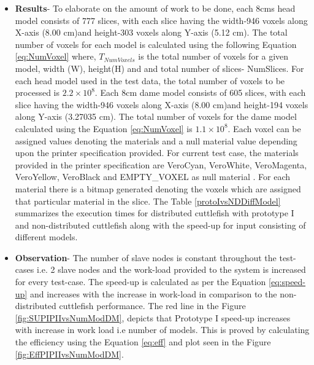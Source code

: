 \begin{enumerate}
\begin{itemize}
\item{\textbf{Results}}- To elaborate on the amount of work to be done, each 8cms head model consists of 777 slices, with each slice having the width-946 voxels along X-axis (8.00 cm)and height-303 voxels along Y-axis (5.12 cm). The total number of voxels for each model is calculated using the following Equation \ref{eq:NumVoxel} where, \begin{math} T_{NumVoxels} \end{math} is the total number of voxels for a given model, width (W), height(H) and and total number of slices- NumSlices. For each head model used in the test data, the total number of voxels to be processed is \begin{math} 2.2 \times 10^{8} \end{math}. Each 8cm dame model consists of 605 slices, with each slice having the width-946 voxels along X-axis (8.00 cm)and height-194 voxels along Y-axis (3.27035 cm). The total number of voxels for the dame model calculated using the Equation \ref{eq:NumVoxel} is  \begin{math} 1.1 \times 10^{8} \end{math}. Each voxel can be assigned values denoting the materials and a null material value depending upon the printer specification provided. For current test case, the materials provided in the printer specification are VeroCyan, VeroWhite, VeroMagenta, VeroYellow, VeroBlack and EMPTY\_VOXEL as null material . For each material there is a bitmap generated denoting the voxels which are assigned that particular material in the slice. The Table \ref{protoIvsNDDiffModel} summarizes the execution times for distributed cuttlefish with prototype I and non-distributed cuttlefish along with the speed-up for input consisting of different models.  
\item{\textbf{Observation}}-  The number of slave nodes is constant throughout the test-cases i.e. 2 slave nodes and the work-load provided to the system is increased for every test-case. The speed-up is calculated as per the Equation \ref{eq:speed-up} and increases with the increase in work-load in comparison to the non-distributed cuttlefish performance. The red line in the Figure \ref{fig:SUPIPIIvsNumModDM},  depicts that Prototype I speed-up increases with increase in work load i.e number of models. This is proved by calculating the efficiency using the Equation \ref{eq:eff} and plot seen in the Figure \ref{fig:EffPIPIIvsNumModDM}. 
\end{itemize}
\end{enumerate}

